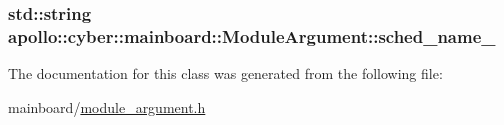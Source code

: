 \hypertarget{classapollo_1_1cyber_1_1mainboard_1_1ModuleArgument_ab6148cdc17b5eaf9fc798bb0df18c40e}{
\subsubsection[{sched\-\_\-name\-\_\-}]{\setlength{\rightskip}{0pt plus 5cm}std\-::string apollo\-::cyber\-::mainboard\-::\-Module\-Argument\-::sched\-\_\-name\-\_\-\hspace{0.3cm}{\ttfamily [private]}}}\label{classapollo_1_1cyber_1_1mainboard_1_1ModuleArgument_ab6148cdc17b5eaf9fc798bb0df18c40e}


The documentation for this class was generated from the following file\-:\begin{DoxyCompactItemize}
\item 
mainboard/\hyperlink{module__argument_8h}{module\-\_\-argument.\-h}\end{DoxyCompactItemize}
